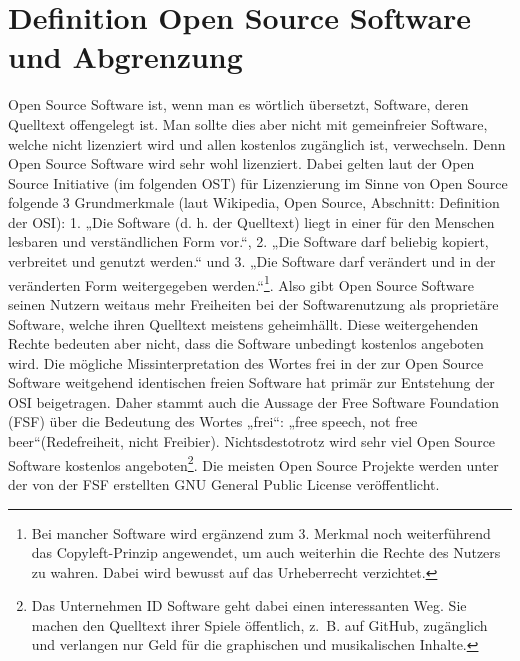 \documentclass[a4paper,12pt]{article}
\begin{document}
\section{Definition Open Source Software und Abgrenzung}
Open Source Software ist, wenn man es wörtlich übersetzt, Software, deren Quelltext offengelegt ist. Man sollte dies aber nicht mit gemeinfreier Software, welche nicht lizenziert wird und allen kostenlos zugänglich ist, verwechseln. Denn Open Source Software wird sehr wohl lizenziert. Dabei gelten laut der Open Source Initiative (im folgenden OST) für Lizenzierung im Sinne von Open Source folgende 3 Grundmerkmale (laut Wikipedia, Open Source, Abschnitt: Definition der OSI): 1. „Die Software (d. h. der Quelltext) liegt in einer für den Menschen lesbaren und verständlichen Form vor.“, 2. „Die Software darf beliebig kopiert, verbreitet und genutzt werden.“ und 3. „Die Software darf verändert und in der veränderten Form weitergegeben werden.“\footnote{Bei mancher Software wird ergänzend zum 3. Merkmal noch weiterführend das Copyleft-Prinzip angewendet, um auch weiterhin die Rechte des Nutzers zu wahren. Dabei wird bewusst auf das Urheberrecht verzichtet.}. Also gibt Open Source Software seinen Nutzern weitaus mehr Freiheiten bei der Softwarenutzung als proprietäre Software, welche ihren Quelltext meistens geheimhällt. Diese weitergehenden Rechte bedeuten aber nicht, dass die Software unbedingt kostenlos angeboten wird. Die mögliche Missinterpretation des Wortes frei in der zur Open Source Software weitgehend identischen freien Software hat primär zur Entstehung der OSI beigetragen. Daher stammt auch die Aussage der Free Software Foundation (FSF) über die Bedeutung des Wortes „frei“: „free speech, not free beer“(Redefreiheit, nicht Freibier). Nichtsdestotrotz wird sehr viel Open Source Software kostenlos angeboten\footnote{Das Unternehmen ID Software geht dabei einen interessanten Weg. Sie machen den Quelltext ihrer Spiele öffentlich, z.~B. auf GitHub, zugänglich und verlangen nur Geld für die graphischen und musikalischen Inhalte.}. Die meisten Open Source Projekte werden unter der von der FSF erstellten GNU General Public License veröffentlicht.\\
\end{document}
